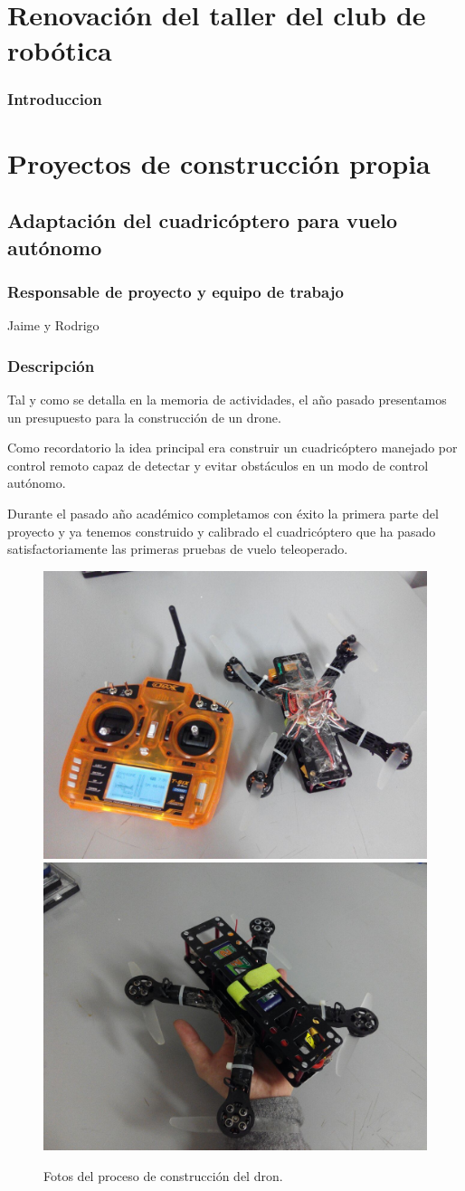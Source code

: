 \documentclass[12pt,twoside]{report}
\begin{document}
\section{Renovación del taller del club de robótica}
\subsubsection{Introduccion}

\section{Proyectos de construcción propia}

\subsection{Adaptación del cuadricóptero para vuelo autónomo}
\subsubsection{Responsable de proyecto y equipo de trabajo}
Jaime y Rodrigo
\subsubsection{Descripción}
Tal y como se detalla en la memoria de actividades, el año pasado presentamos un presupuesto para la construcción de un drone.

Como recordatorio la idea principal era construir un cuadricóptero manejado por control remoto capaz de detectar y evitar obstáculos en un modo de control autónomo.

Durante el pasado año académico completamos con éxito la primera parte del proyecto y ya tenemos construido y calibrado el cuadricóptero que ha pasado satisfactoriamente las primeras pruebas de vuelo teleoperado.


\begin{figure}[hbtp]
\centerline{
    \includegraphics[width=0.45\linewidth]{fotos/dron1.jpg}
    \includegraphics[width=0.45\linewidth]{fotos/dron2.jpg}}
\caption*{
Fotos del proceso de construcción del dron.}
\end{figure}
\end{document}
